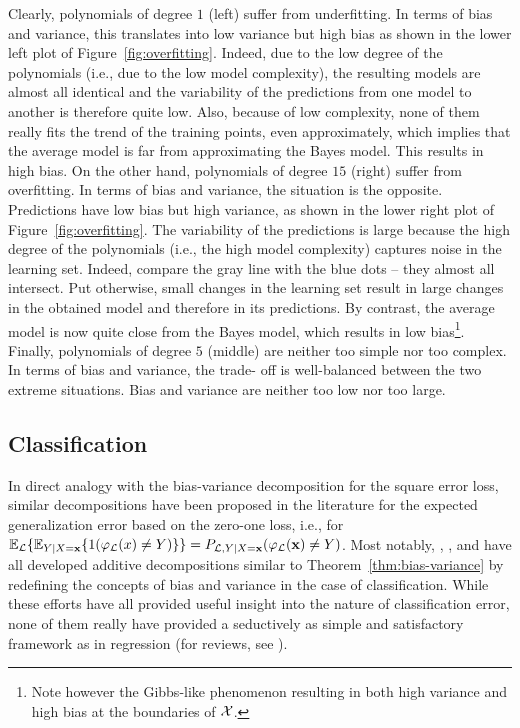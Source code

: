Clearly, polynomials of degree $1$ (left) suffer from underfitting. In terms of
bias and variance, this translates into low variance but high bias as shown in
the lower left plot of Figure~\ref{fig:overfitting}. Indeed, due to the low
degree of the polynomials (i.e., due to the low model complexity), the
resulting models are almost all identical and  the variability of the
predictions from one model to another is therefore quite low. Also, because of
low complexity, none of them really fits the trend of the training points, even
approximately, which implies that the average model is far from approximating
the Bayes model. This results in high bias. On the other hand, polynomials of
degree $15$ (right) suffer from overfitting. In terms of bias and variance, the
situation is the opposite. Predictions have low bias but high variance, as
shown in the lower right plot of Figure~\ref{fig:overfitting}. The variability
of the predictions is large because the high degree of the polynomials (i.e.,
the high model complexity) captures noise in the learning set. Indeed, compare
the gray line with the blue dots -- they almost all intersect. Put otherwise,
small changes in the learning set result in large changes in the obtained model
and therefore in its predictions. By contrast, the average model is now quite
close from the Bayes model, which results in low bias\footnote{Note however the
Gibbs-like phenomenon resulting in both high variance and high bias at the
boundaries of ${\cal X}$.}. Finally, polynomials of degree $5$ (middle) are
neither too simple nor too complex. In terms of bias and variance, the trade-
off is well-balanced between the two extreme situations. Bias and variance are
neither too low nor too large.


\subsection{Classification}
\label{sec:bias-variance:classification}

In direct analogy with the bias-variance decomposition for the square error
loss, similar decompositions have been proposed in the literature for the
expected generalization error based on the zero-one loss, i.e., for
$\mathbb{E}_{\cal L}\{ \mathbb{E}_{Y|X=\mathbf{x}} \{ 1(\varphi_{\cal L}(x)
\neq Y) \} \} = P_{{\cal L},Y|X=\mathbf{x}}(\varphi_{\cal L}(\mathbf{x}) \neq
Y)$. Most notably, \citet{dietterich:1995}, \citet{breiman:1996},
\citet{kohavi:1996} and \citet{tibshirani:1996} have all developed additive
decompositions similar to Theorem~\ref{thm:bias-variance} by redefining the
concepts of bias and variance in the case of classification. While these
efforts have all provided useful insight into the nature of classification
error, none of them really have provided a seductively as simple and
satisfactory framework as in regression (for reviews, see
\citep{friedman:1997,geurts:2002,james:2003}).

